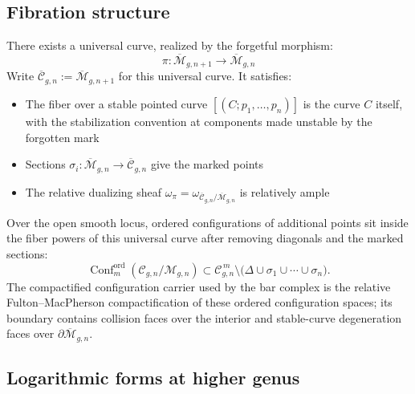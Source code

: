 \subsection{Fibration structure}

\begin{theorem}
\label{thm:universal-curve-fibration}
There exists a universal curve, realized by the forgetful morphism:
\begin{equation}
\pi: \overline{\mathcal{M}}_{g,n+1} \to \overline{\mathcal{M}}_{g,n}
\end{equation}
Write $\overline{\mathcal C}_{g,n}:=\overline{\mathcal M}_{g,n+1}$
for this universal curve. It satisfies:
\begin{itemize}
\item The fiber over a stable pointed curve
$[(C;p_1,\ldots,p_n)]$ is the curve $C$ itself, with the
stabilization convention at components made unstable by the forgotten
mark
\item Sections $\sigma_i: \overline{\mathcal{M}}_{g,n} \to \overline{\mathcal{C}}_{g,n}$ give the marked points
\item The relative dualizing sheaf $\omega_\pi = \omega_{\overline{\mathcal{C}}_{g,n}/\overline{\mathcal{M}}_{g,n}}$ is relatively ample
\end{itemize}

Over the open smooth locus, ordered configurations of additional
points sit inside the fiber powers of this universal curve after
removing diagonals and the marked sections:
\begin{equation}
\operatorname{Conf}^{\mathrm{ord}}_m(\mathcal C_{g,n}/\mathcal M_{g,n})
\subset
\mathcal C_{g,n}^{\,m}\setminus
\bigl(\Delta\cup\sigma_1\cup\cdots\cup\sigma_n\bigr).
\end{equation}
The compactified configuration carrier used by the bar complex is the
relative Fulton--MacPherson compactification of these ordered
configuration spaces; its boundary contains collision faces over the
interior and stable-curve degeneration faces over
$\partial\overline{\mathcal M}_{g,n}$.
\end{theorem}

\subsection{Logarithmic forms at higher genus}

